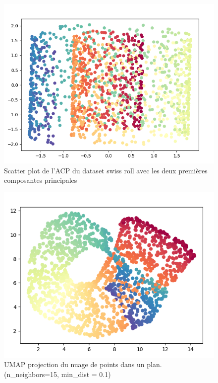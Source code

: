 \documentclass{beamer}
\theoremstyle{definition}
\begin{document}
\begin{frame}
	\begin{minipage}[c]{1\linewidth}
		\begin{minipage}[t]{0.4\linewidth}\centering\begin{figure}
				\centering
				\includegraphics[scale=0.25]{acp_swiss_roll.png}
				\caption{Scatter plot de l'ACP du dataset swiss roll avec les deux premières composantes principales}
		\end{figure}\end{minipage}\hfill 
		\begin{minipage}[t]{0.43\linewidth}\centering\begin{figure}
				\begin{center}
					\includegraphics[scale=0.27]{umap2_swiss_roll.png}			
					\caption{UMAP projection du nuage de points dans un plan.\\ 
					(n\_neighbors=15, min\_dist = 0.1) }
				\end{center}
				
		\end{figure}\end{minipage}
	\end{minipage}
	
	
\end{frame}
\end{document}
